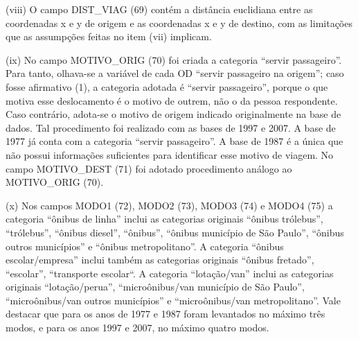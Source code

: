 \begin{compactitem}[]
\item(viii) O campo DIST_VIAG (69) contém a distância euclidiana entre as coordenadas x e y de origem e as coordenadas x e y de destino, com as limitações que as assumpções feitas no item (vii) implicam.
\item(ix) No campo MOTIVO_ORIG (70) foi criada a categoria ``servir passageiro''. Para tanto, olhava-se a variável de cada OD ``servir passageiro na origem''; caso fosse afirmativo (1), a categoria adotada é ``servir passageiro'', porque o que motiva esse deslocamento é o motivo de outrem, não o da pessoa respondente. Caso contrário, adota-se o motivo de origem indicado originalmente na base de dados. Tal procedimento foi realizado com as bases de 1997 e 2007. A base de 1977 já conta com a categoria ``servir passageiro''. A base de 1987 é a única que não possui informações suficientes para identificar esse motivo de viagem. No campo MOTIVO_DEST (71) foi adotado procedimento análogo ao MOTIVO_ORIG (70).
\item (x) Nos campos MODO1 (72), MODO2 (73), MODO3 (74) e MODO4 (75) a categoria ``ônibus de linha'' inclui as categorias originais ``ônibus trólebus'', ``trólebus'', ``ônibus diesel'', ``ônibus'', ``ônibus município de São Paulo'', ``ônibus outros municípios'' e ``ônibus metropolitano''. A categoria ``ônibus escolar/empresa'' inclui também as categorias originais ``ônibus fretado'', ``escolar'', ``transporte escolar``. A categoria ``lotação/van'' inclui as categorias originais ``lotação/perua'', ``microônibus/van município de São Paulo'', ``microônibus/van outros municípios'' e ``microônibus/van metropolitano''. Vale destacar que para os anos de 1977 e 1987 foram levantados no máximo três modos, e para os anos 1997 e 2007, no máximo quatro modos.
\end{compactitem}

\clearpage
\newcommand{\layoutTamColA}{0.50cm}
\newcommand{\layoutTamColB}{3.20cm}
\newcommand{\layoutTamColC}{4.20cm}
\newcommand{\layoutTamColD}{0.90cm}
\newcommand{\layoutTamColE}{4.50cm}
\newcommand{\layoutColA}[2]{%
	\multicolumn{1}{|c|}{\multirow{#1}{\layoutTamColA}{\centering#2}}%
}
\newcommand{\layoutColB}[2]{\multicolumn{1}{c|}{\multirow{#1}{\layoutTamColB}{\centering#2}}}
\newcommand{\layoutColC}[2]{\multicolumn{1}{c|}{\multirow{#1}{\layoutTamColC}{\centering#2}}}
\newcommand{\layoutColD}[2]{\multicolumn{1}{c|}{\multirow{#1}{\layoutTamColD}{\centering#2}}}


